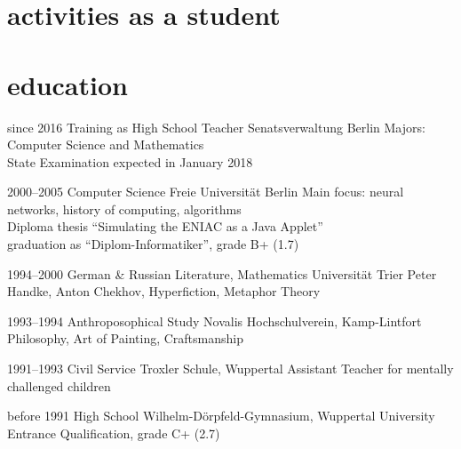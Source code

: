 \documentclass[]{friggeri-cv} %
\begin{document}
\section{activities as a student}
\begin{entrylist}
\end{entrylist}

\pagebreak

\section{education}
\begin{entrylist}

\entry
{since 2016}
{Training as High School Teacher}
{Senatsverwaltung Berlin}
{Majors: Computer Science and Mathematics\\
State Examination expected in January 2018
}

\entry
{2000--2005}
{Computer Science}
{Freie Universität Berlin}
{Main focus: neural networks, history of computing, algorithms\\
Diploma thesis ``Simulating the ENIAC as a Java Applet''\\
graduation as ``Diplom-Informatiker'', grade B+ (1.7)
}

\entry
{1994--2000}
{German \& Russian Literature, Mathematics}
{Universität Trier}
{Peter Handke, Anton Chekhov, Hyperfiction, Metaphor Theory}

\entry
{1993--1994}
{Anthroposophical Study}
{Novalis Hochschulverein, Kamp-Lintfort}
{Philosophy, Art of Painting, Craftsmanship}

\entry
{1991--1993}
{Civil Service}
{Troxler Schule, Wuppertal}
{Assistant Teacher for mentally challenged children}

\entry
{before 1991}
{High School}
{Wilhelm-Dörpfeld-Gymnasium, Wuppertal}
{University Entrance Qualification, grade C+ (2.7)}

\end{entrylist}
\end{document}
